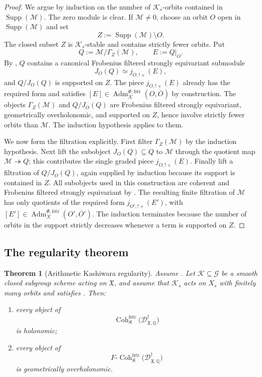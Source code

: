 \documentclass[11pt]{amsart}
\theoremstyle{plain}
\newtheorem{theorem}{Theorem}[section]
\theoremstyle{definition}
\theoremstyle{remark}
\newcommand{\Coh}{\operatorname{Coh}}
\newcommand{\Supp}{\operatorname{Supp}}
\newcommand{\fstr}{\mathrm{fstr}}
\newcommand{\Adm}{\operatorname{Adm}}
\begin{document}
\begin{proof}
We argue by induction on the number of \(\mathcal K_s\)-orbits contained in
\(\Supp(\mathcal M)\).  The zero module is clear.  If \(\mathcal M\neq0\),
choose an orbit \(O\) open in \(\Supp(\mathcal M)\) and set
\[
  Z:=\Supp(\mathcal M)\setminus O.
\]
The closed subset \(Z\) is \(\mathcal K_s\)-stable and contains strictly fewer
orbits.  Put
\[
  Q:=\mathcal M/\Gamma_Z(\mathcal M),
  \qquad
  E:=Q|_O.
\]
By , \(Q\) contains a canonical Frobenius
filtered strongly equivariant submodule
\[
  J_O(Q)\simeq j_{O,!+}(E),
\]
and \(Q/J_O(Q)\) is supported on \(Z\).  The piece \(j_{O,!+}(E)\) already has
the required form and satisfies
\([E]\in\Adm^{\Phi,\fstr}_{\mathcal K}(O,\overline O)\) by construction.  The
objects \(\Gamma_Z(\mathcal M)\) and \(Q/J_O(Q)\) are Frobenius filtered strongly
equivariant, geometrically overholonomic, and supported on \(Z\), hence involve
strictly fewer orbits than \(\mathcal M\).  The induction hypothesis applies to
them.

We now form the filtration explicitly.  First filter
\(\Gamma_Z(\mathcal M)\) by the induction hypothesis.  Next lift the subobject
\(J_O(Q)\subseteq Q\) to \(\mathcal M\) through the quotient map
\(\mathcal M\twoheadrightarrow Q\); this contributes the single graded piece
\(j_{O,!+}(E)\).  Finally lift a filtration of \(Q/J_O(Q)\), again supplied by
induction because its support is contained in \(Z\).  All subobjects used in
this construction are coherent and Frobenius filtered strongly equivariant by
.  The resulting finite filtration of
\(\mathcal M\) has only quotients of the required form \(j_{O',!+}(E')\), with
\([E']\in\Adm^{\Phi,\fstr}_{\mathcal K}(O',\overline O')\).  The induction
terminates because the number of orbits in the support strictly decreases
whenever a term is supported on \(Z\).
\end{proof}

\subsection{The regularity theorem}

\begin{theorem}[Arithmetic Kashiwara regularity]
\label{thm:arithmetic-kashiwara-regularity}
Assume .  Let \(\mathcal K\subseteq\mathcal G\) be a smooth
closed subgroup scheme acting on \(\mathfrak X\), and assume that
\(\mathcal K_s\) acts on \(X_s\) with finitely many orbits and satisfies
.  Then:
\begin{enumerate}[label=\textup{(\roman*)}]
\item every object of
\[
  \Coh^{\fstr}_{\mathfrak K}
  \bigl(\mathscr D^\dagger_{\mathfrak X,\mathbb Q}\bigr)
\]
is holonomic;
\item every object of
\[
  F\text{-}\Coh^{\fstr}_{\mathfrak K}
  \bigl(\mathscr D^\dagger_{\mathfrak X,\mathbb Q}\bigr)
\]
is geometrically overholonomic.
\end{enumerate}
\end{theorem}
\end{document}
